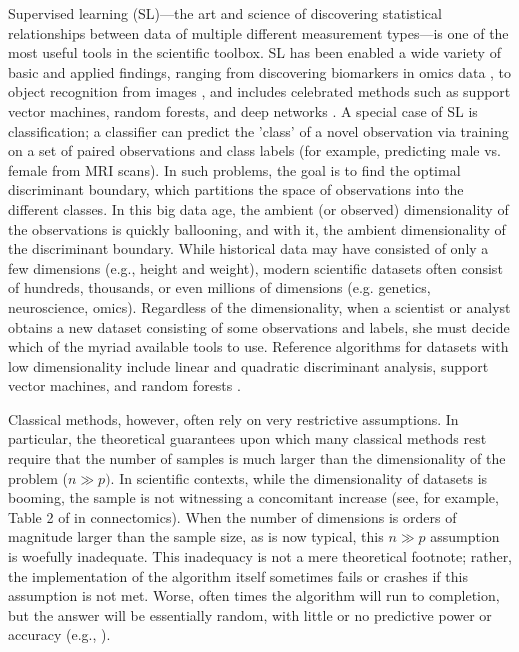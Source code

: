 \documentclass[10pt]{article}
\begin{document}
\vspace{15pt}


Supervised learning (SL)---the art and science of discovering statistical relationships between data of multiple different measurement types---is one of the most useful tools in the scientific toolbox.  SL has been enabled a wide variety of basic and applied findings, ranging from discovering biomarkers in omics data \cite{XXX}, to object recognition from images \cite{XXX}, and includes celebrated methods such as support vector machines, random forests, and deep networks \cite{XXX}.  A special case of SL is classification; a classifier can predict the 'class' of a novel observation via training on a set of paired observations and class labels (for example, predicting male vs. female from MRI scans).   In such problems, the goal is to find the optimal discriminant boundary, which partitions the space of observations into the different classes.  In this big data age, the ambient (or observed) dimensionality of the observations is quickly ballooning, and with it, the ambient dimensionality of the discriminant boundary.  While historical data may have consisted of only a few dimensions (e.g., height and weight), modern scientific datasets often consist of hundreds, thousands, or even millions of dimensions (e.g. genetics, neuroscience, omics). Regardless of the dimensionality, when a scientist or analyst obtains a new dataset consisting of some observations and labels, she must decide which of the myriad available tools to use. {Reference} algorithms for datasets with low dimensionality include linear and quadratic discriminant analysis, support vector machines, and random forests \cite{Hastie2004}. 


Classical methods, however, often rely on very restrictive assumptions. In particular, the theoretical guarantees upon which many classical methods rest require that the number of samples is much larger than the dimensionality of the problem ($n \gg p)$.  
In scientific contexts, while the dimensionality of datasets is booming, the sample is not witnessing a concomitant increase (see, for example, Table 2 of \cite{diMartino2013a} in connectomics).
When the number of dimensions is orders of magnitude larger than the sample size, as is now typical, this $n \gg p$ assumption is woefully inadequate.
This inadequacy is not a mere theoretical footnote; rather, the implementation of the algorithm itself sometimes fails or crashes if this assumption is not met.  Worse, often times the algorithm will run to completion, but the answer will be essentially random, with little or no predictive power or accuracy (e.g., \cite{Eklund2012}).
\end{document}
